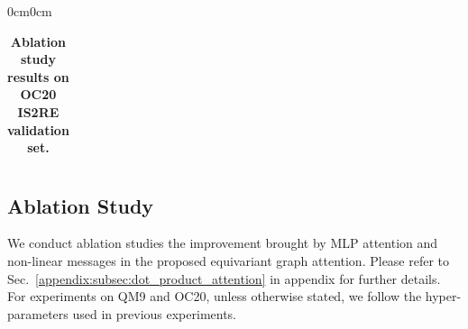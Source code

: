 \begin{table}[t]
\begin{adjustwidth}{0cm}{0cm}
{\begin{tabular}{cccccccccccccccccc}


\bottomrule[1.2pt]

\end{tabular}
}

\vspace{-3mm}
\end{adjustwidth}
\caption{\textbf{Ablation study results on OC20 IS2RE validation set.}
}
\vspace{-6.75mm}
\label{tab:oc20_ablation}
\end{table}



\vspace{-2.25mm}
\subsection{Ablation Study}
\vspace{-2.5mm} 
\label{subsec:ablation_study}

We conduct ablation studies  the improvement brought by MLP attention and non-linear messages in the proposed equivariant graph attention.
Please refer to Sec.~\ref{appendix:subsec:dot_product_attention} in appendix for further details.
For experiments on QM9 and OC20, unless otherwise stated, we follow the hyper-parameters used in previous experiments. 


